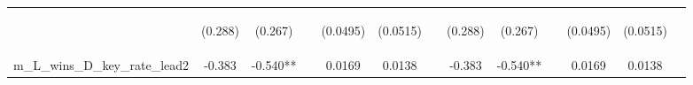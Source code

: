 \documentclass[]{article}
\begin{document}
\begin{center}
\begin{tabular}{lcccccccccccc}
\vspace{4pt} & \begin{footnotesize}(0.288)\end{footnotesize} & \begin{footnotesize}(0.267)\end{footnotesize} & \begin{footnotesize}\end{footnotesize} & \begin{footnotesize}(0.0495)\end{footnotesize} & \begin{footnotesize}(0.0515)\end{footnotesize} & \begin{footnotesize}\end{footnotesize} & \begin{footnotesize}(0.288)\end{footnotesize} & \begin{footnotesize}(0.267)\end{footnotesize} & \begin{footnotesize}\end{footnotesize} & \begin{footnotesize}(0.0495)\end{footnotesize} & \begin{footnotesize}(0.0515)\end{footnotesize} & \begin{footnotesize}\end{footnotesize} \\
m\_L\_wins\_D\_key\_rate\_lead2 & -0.383 & -0.540** &  & 0.0169 & 0.0138 &  & -0.383 & -0.540** &  & 0.0169 & 0.0138 &  \\

\end{tabular}
\end{center}
\end{document}
